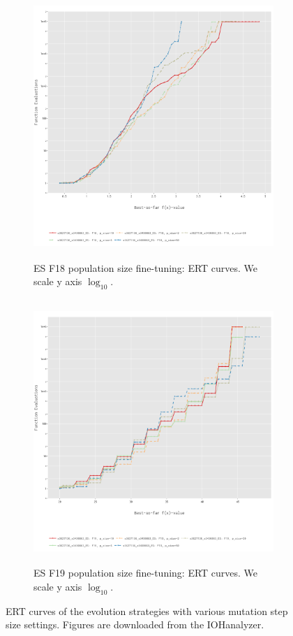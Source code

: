 \documentclass{article}
\begin{document}
\begin{figure}[!ht]
    \centering
    \begin{subfigure}[h]{0.95\linewidth}
        \includegraphics[width=\linewidth, height=10cm]{es/f18/ERT18ps.png}
        \caption{ES F18 population size fine-tuning: ERT curves. We scale y axis $\log_{10}$.}
    \end{subfigure}
    \hfill
    \begin{subfigure}[h]{0.95\linewidth}
        \includegraphics[width=\linewidth, height=10cm]{es/f19/ERT19ps.png}
        \caption{ES F19 population size fine-tuning: ERT curves. We scale y axis $\log_{10}$.}
    \end{subfigure}
    \caption{ERT curves of the evolution strategies with various mutation step size settings. Figures are downloaded from the IOHanalyzer.}
    \label{fig:experi-es-psize-ert}
\end{figure}
\end{document}
